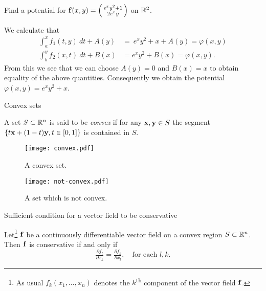 \begin{example*}
    Find a potential for \(\mathbf{f}(x,y) = \left(\begin{smallmatrix}
        e^x y^2 + 1\\ 2e^x y
    \end{smallmatrix}\right)\) on \(\mathbb{R}^2\).
\end{example*}
\begin{solution}
    We calculate that
    \[
        \begin{aligned}
            \int_{a}^{x} f_1(t,y) \ dt + A(y)
             & =  \ e^x y^2 + x + A(y) = \varphi(x,y) \\
            \int_{b}^{y} f_2(x,t) \ dt + B(x)
             & =  e^x y^2 + B(x) = \varphi(x,y).
        \end{aligned}
    \]
    From this we see that we can choose \(A(y) = 0\) and \(B(x)=x\) to obtain equality of the above quantities.
    Consequently we obtain the potential  \(\varphi(x,y) = e^x y^2 + x\).
\end{solution}



{Convex sets}


\begin{definition}
    A set \(S\subset \mathbb{R}^n\) is said to be \emph{convex} if for any \(\mathbf{x},\mathbf{y}\in S\) the segment \(\{t\mathbf{x} + (1-t)\mathbf{y}, t\in[0,1]\}\) is contained in \(S\).
\end{definition}



\begin{figure}
    \centering
    \texttt{[image: convex.pdf]}
    \caption{A convex set.}
\end{figure}


\begin{figure}
    \centering
    \texttt{[image: not-convex.pdf]}
    \caption{A set which is not convex.}
\end{figure}

{Sufficient condition for a vector field to be conservative}


\begin{theorem}
    Let\footnote{As usual  \(  f_k(x_1,\ldots,x_n)\) denotes the \(k\)\textsuperscript{th} component of the vector field \(\mathbf{f}\).} \(\mathbf{f}\) be a continuously differentiable vector field on a convex region \(S\subset \mathbb{R}^n\).
    Then \(\mathbf{f}\) is conservative if and only if
    \[
        \tfrac{\partial f_l}{\partial x_k} = \tfrac{\partial f_k}{\partial x_l},
        \quad \text{for each \(l,k\)}.
    \]
\end{theorem}



